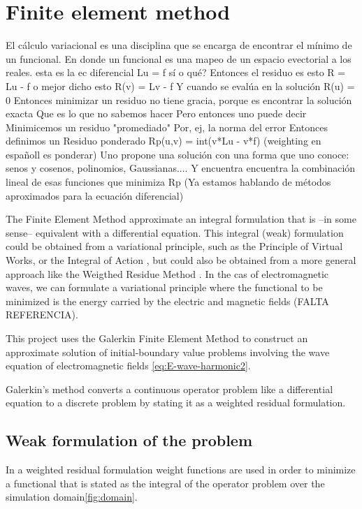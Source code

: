 \chapter{Finite element method}
\label{ch:Finite_element_method}
El cálculo variacional es una disciplina que se encarga de encontrar el mínimo de un funcional.
En donde un funcional es una mapeo de un espacio evectorial a los reales.
esta es la ec diferencial
Lu = f
sí o qué?
Entonces
el residuo es esto
R = Lu - f
o mejor dicho
esto
R(v) = Lv - f
Y cuando se evalúa en la solución
R(u) = 0
Entonces minimizar un residuo no tiene gracia, porque es encontrar la solución exacta
Que es lo que no sabemos hacer
Pero entonces uno puede decir
Minimicemos un residuo "promediado"
Por, ej, la norma del error
Entonces definimos un Residuo ponderado
Rp(u,v) = int(v*Lu - v*f)
(weighting en españoll es ponderar)
Uno propone una solución con una forma que uno conoce: senos y cosenos, polinomios, Gaussianas....
Y encuentra encuentra la combinación lineal de esas funciones que minimiza Rp
(Ya estamos hablando de métodos aproximados para la ecuación diferencial)

The Finite Element Method approximate an integral formulation that is --in some sense-- equivalent with a differential equation. This integral (weak) formulation could be obtained from a variational principle, such as the Principle of Virtual Works, or the Integral of Action \cite{Goldstein2001}, but could also be obtained from a more general approach like the Weigthed Residue Method \cite{Zienkiewicz2005, Reddy_functional_analysis}. In the cas of electromagnetic waves, we can formulate a variational principle where the functional to be minimized is the energy carried by the electric and magnetic fields (FALTA REFERENCIA). 

This project uses the Galerkin Finite Element Method to construct an approximate solution of  initial-boundary value problems involving the wave equation of electromagnetic fields \ref{eq:E-wave-harmonic2}.

Galerkin's method converts a continuous operator problem like a differential equation to a discrete problem by stating it as a weighted residual formulation. 

\section{Weak formulation of the problem}

In a weighted residual formulation weight functions 
are used in order to minimize a functional
that is stated as the integral of the operator problem over the simulation domain\ref{fig:domain}. 

